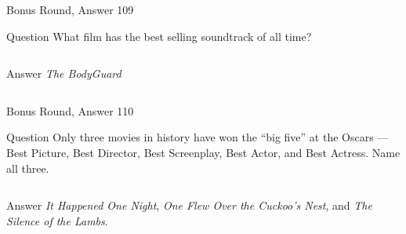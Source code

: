 \documentclass[11pt]{beamer}
\begin{document}
\begin{frame}[t]{Bonus Round, Answer 109}
  \vspace{2em}
  \begin{block}{Question}
    What film has the best selling soundtrack of all time?
  \end{block}
  \pause{}
  \begin{columns}[T,totalwidth=\linewidth]
    \begin{column}{0.35\linewidth}
      \begin{block}{Answer}
        \emph{The BodyGuard}
      \end{block}
    \end{column}
    \begin{column}{0.6\linewidth}
      \begin{center}
        \texttt{[image: \{Images/bodyguard]}.jpg}
      \end{center}
    \end{column}
  \end{columns}
\end{frame}


\begin{frame}[t]{Bonus Round, Answer 110}
  \vspace{2em}
  \begin{block}{Question}
    Only three movies in history have won the ``big five'' at the Oscars — Best Picture, Best Director, Best Screenplay, Best Actor, and Best Actress. Name all three.
  \end{block}
  \pause{}
  \begin{columns}[T,totalwidth=\linewidth]
    \begin{column}{0.35\linewidth}
      \begin{block}{Answer}
        \emph{It Happened One Night}, \emph{One Flew Over the Cuckoo's Nest}, and \emph{The Silence of the Lambs}.
      \end{block}
    \end{column}
    \begin{column}{0.6\linewidth}
      \begin{center}
        \texttt{[image: \{Images/big-five]}.png}
      \end{center}
    \end{column}
  \end{columns}
\end{frame}


\section*{\ }
\end{document}
